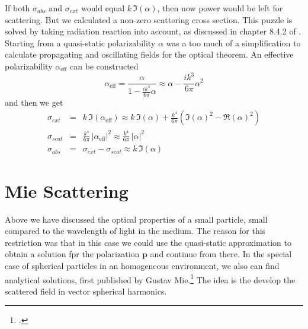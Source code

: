 If both $\sigma_{abs}$ and $\sigma_{ext}$  would equal $ k \, \Im ( \alpha )$, then now power would be left for scattering. But we calculated a non-zero scattering cross section. 
This puzzle is solved by taking radiation reaction into account, as discussed in chapter 8.4.2 of \cite{Novotny-Hecht2012}. Starting from a quasi-static polarizability $\alpha$ was a too much of a simplification to calculate propagating and oscillating fields  for the optical theorem. An effective  polarizability $\alpha_{\text{eff}}$ can be constructed 
\[
 \alpha_{\text{eff}} = \frac{\alpha}{1 - \frac{i k^3 }{6 \pi} \alpha}
 \approx \alpha  - \frac{i k^3 }{6 \pi} \alpha^2
\]
and then we get
\begin{eqnarray*}
 \sigma_{ext} &= & k \, \Im ( \alpha_{\text{eff}}  ) \approx 
 k \, \Im ( \alpha  )  + \frac{k^4}{6 \pi} \left( \Im (\alpha)^2 - \Re (\alpha)^2 \right) \\
  \sigma_{scat} & = &  \frac{k^4}{6 \pi }  \, |\alpha_{\text{eff}} |^2  \approx  \frac{k^4}{6 \pi }  \, |\alpha |^2 \\
   \sigma_{abs} &=&  \sigma_{ext} - \sigma_{scat} \approx  k \, \Im ( \alpha  ) 
\end{eqnarray*}



\section{Mie Scattering}

Above we have discussed the optical properties of a small particle, small compared to the wavelength of light in the medium. The reason for this restriction was that in this case we could use the quasi-static approximation to obtain a solution fpr the polarization $\mathbf{p}$ and continue from there. In the special case of spherical particles in an homogeneous environment, we also can find analytical solutions, first published by Gustav Mie.\footcite[chapter 4]{BH-book} The idea is the develop the scattered field in vector spherical harmonics.

